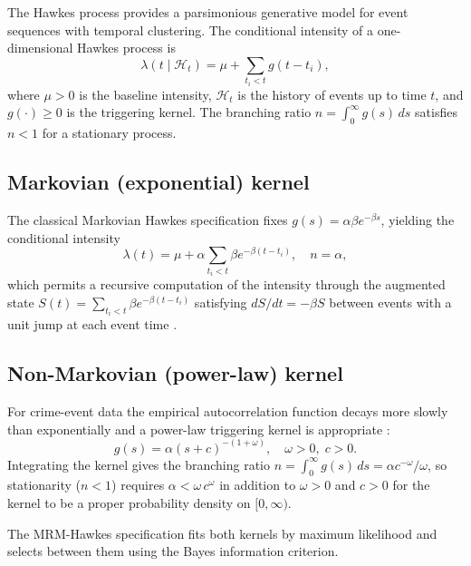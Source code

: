 \documentclass[article,shortnames,nojss]{jss}
\begin{document}
The Hawkes process \citep{Hawkes1971, Ogata1981} provides a
parsimonious generative model for event sequences with temporal
clustering. The conditional intensity of a one-dimensional Hawkes
process is
\begin{equation}
\label{eq:hawkes-1d}
\lambda(t \mid \mathcal{H}_t) = \mu +
\sum_{t_i < t} g(t - t_i),
\end{equation}
where $\mu > 0$ is the baseline intensity, $\mathcal{H}_t$ is the
history of events up to time $t$, and $g(\cdot) \ge 0$ is the
triggering kernel. The branching ratio $n = \int_0^\infty g(s)\,ds$
satisfies $n < 1$ for a stationary process.

\subsection{Markovian (exponential) kernel}

The classical Markovian Hawkes specification fixes
$g(s) = \alpha \beta e^{-\beta s}$, yielding the conditional
intensity
\begin{equation}
\lambda(t) = \mu + \alpha \sum_{t_i < t} \beta e^{-\beta (t - t_i)},
\quad n = \alpha,
\end{equation}
which permits a recursive computation of the intensity through the
augmented state $S(t) = \sum_{t_i < t} \beta e^{-\beta(t-t_i)}$
satisfying $dS/dt = -\beta S$ between events with a unit jump at
each event time \citep{Ogata1981, Daley2003}.

\subsection{Non-Markovian (power-law) kernel}

For crime-event data the empirical autocorrelation function decays
more slowly than exponentially and a power-law triggering kernel
is appropriate \citep{Mohler2011}:
\begin{equation}
g(s) = \alpha (s + c)^{-(1 + \omega)},
\quad
\omega > 0, \; c > 0.
\end{equation}
Integrating the kernel gives the branching ratio
$n = \int_0^\infty g(s)\,ds = \alpha c^{-\omega}/\omega$, so
stationarity ($n<1$) requires $\alpha < \omega\, c^{\omega}$ in
addition to $\omega>0$ and $c>0$ for the kernel to be a proper
probability density on $[0,\infty)$.

The MRM-Hawkes specification fits both kernels by maximum
likelihood and selects between them using the Bayes information
criterion.
\end{document}
